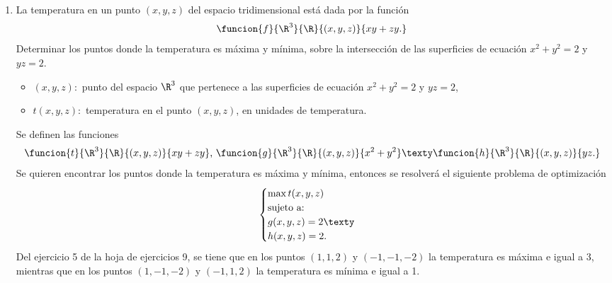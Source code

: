 \documentclass[a4,11pt]{aleph-examen}
\begin{document}
\begin{preguntas}
\begin{respuesta}
\begin{respuesta}
\begin{respuesta}
\begin{enumerate}
\begin{respuesta}
    Los puntos críticos del lagrangiano de este problema de optimización son $(0,0,0,-6)$, $(\sqrt{3}/2,3\sqrt{3},0,3)$, $(-\sqrt{3}/2,-3\sqrt{3},0,3)$ y $\l(-1,-4,\pm 4,2\r)$.
    
\end{respuesta}



\item
	La temperatura en un punto $(x,y,z)$ del espacio tridimensional está dada por la función 
    \[
        \funcion{f}{\R^3}{\R}{(x,y,z)}{xy+zy.}
    \] 
    Determinar los puntos donde la temperatura es máxima y mínima, sobre la intersección de las superficies de ecuación $x^2+y^2=2$ y $yz=2$.
    
\begin{respuesta}
    \begin{itemize}
        \item $(x,y,z):$ punto del espacio $\R^3$ que pertenece a las superficies de ecuación $x^2+y^2=2$ y $yz=2$,
        \item $t(x,y,z):$ temperatura en el punto $(x,y,z)$, en unidades de temperatura. 
    \end{itemize}
    Se definen las funciones 
     \[
        \funcion{t}{\R^3}{\R}{(x,y,z)}{xy+zy}\\ \mbox{, } \funcion{g}{\R^3}{\R}{(x,y,z)}{x^2+y^2} \texty \funcion{h}{\R^3}{\R}{(x,y,z)}{yz.}
    \]
    Se quieren encontrar los puntos donde la temperatura es máxima y mínima, entonces se resolverá el siguiente problema de optimización
    \[
        \begin{cases}
            \max t(x,y,z)\\
            \text{sujeto  a:}\\
            g(x,y,z)=2 \texty\\
            h(x,y,z)=2.
        \end {cases}
    \]
    Del ejercicio 5 de la hoja de ejercicios 9, se tiene que en los puntos $(1,1,2)$ y $(-1,-1,-2)$ la temperatura es máxima e igual a 3, mientras que en los puntos $(1,-1,-2)$ y $(-1,1,2)$ la temperatura es mínima e igual a 1.
\end{respuesta}



\end{enumerate}
\end{respuesta}
\end{respuesta}
\end{respuesta}
\end{preguntas}
\end{document}
